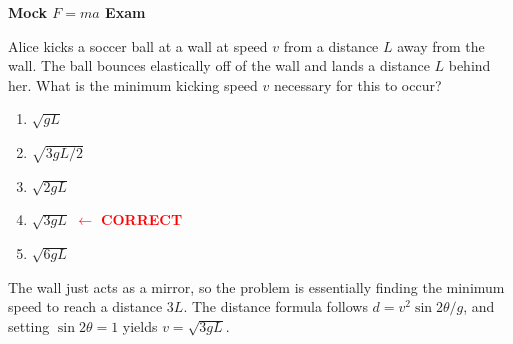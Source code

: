\documentclass[11pt]{scrartcl}
\title{\titlee}
\author{Cambridge Physics Academy}
\date{2023-2024}
\newcommand{\titlee}{Mock $F=ma$ Exam}
\begin{document}
\thispagestyle{empty}
\begin{center}
    
    
    \Huge \textbf{\textsf{\titlee}}

    \large \theauthor
\end{center}

\begin{prob}
    Alice kicks a soccer ball at a wall at speed $v$ from a distance $L$ away from the wall. The ball bounces elastically off of the wall and lands a distance $L$ behind her. What is the minimum kicking speed $v$ necessary for this to occur?
    \begin{enumerate}[label = (\Alph*)]
\item $\sqrt{gL}$
\item $\sqrt{3gL/2}$
\item $\sqrt{2gL}$
\item $\sqrt{3gL}$ \textcolor{red}{$\leftarrow$ \textbf{CORRECT}}
\item $\sqrt{6gL}$
\end{enumerate}
\end{prob}
\begin{sol}
    The wall just acts as a mirror, so the problem is essentially finding the minimum speed to reach a distance $3L$. The distance formula follows $d=v^2\sin2\theta/g$, and setting $\sin 2\theta=1$ yields $v=\sqrt{3gL}$.
\end{sol}
\end{document}
